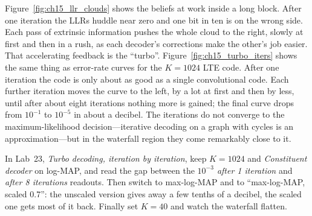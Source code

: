 
Figure~\ref{fig:ch15_llr_clouds} shows the beliefs at work inside a long block. After one
iteration the LLRs huddle near zero and one bit in ten is on the wrong side. Each pass of
extrinsic information pushes the whole cloud to the right, slowly at first and then in a rush, as
each decoder's corrections make the other's job easier. That accelerating feedback is the
``turbo''. Figure~\ref{fig:ch15_turbo_iters} shows the same thing as error-rate curves for the
$K=1024$ LTE code. After one iteration the code is only about as good as a single convolutional
code. Each further iteration moves the curve to the left, by a lot at first and then by less,
until after about eight iterations nothing more is gained; the final curve drops from $10^{-1}$ to
$10^{-5}$ in about a decibel. The iterations do not converge to the maximum-likelihood
decision---iterative decoding on a graph with cycles is an approximation---but in the waterfall
region they come remarkably close to it.


\begin{tryit}
In Lab~23, \emph{Turbo decoding, iteration by iteration}, keep $K=1024$ and \emph{Constituent
decoder} on log-MAP, and read the gap between the \emph{$10^{-3}$ after 1 iteration} and
\emph{after 8 iterations} readouts. Then switch to max-log-MAP and to ``max-log-MAP, scaled 0.7'':
the unscaled version gives away a few tenths of a decibel, the scaled one gets most of it back.
Finally set $K=40$ and watch the waterfall flatten.
\end{tryit}


